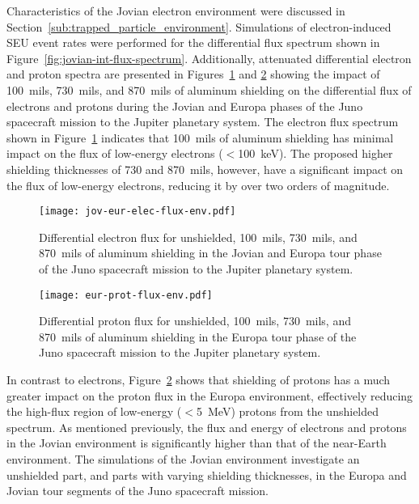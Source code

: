 Characteristics of the Jovian electron environment were discussed in Section~\ref{sub:trapped_particle_environment}.
Simulations of electron-induced SEU event rates were performed for the differential flux spectrum shown in Figure~\ref{fig:jovian-int-flux-spectrum}.
Additionally, attenuated differential electron and proton spectra are presented in Figures~\ref{fig:jov-eur-elec-flux-env} and \ref{fig:eur-prot-flux-env} showing the impact of 100~mils, 730~mils, and 870~mils of aluminum shielding on the differential flux of electrons and protons during the Jovian and Europa phases of the Juno spacecraft mission to the Jupiter planetary system.
The electron flux spectrum shown in Figure~\ref{fig:jov-eur-elec-flux-env} indicates that 100~mils of aluminum shielding has minimal impact on the flux of low-energy electrons ($<$100~keV).
The proposed higher shielding thicknesses of 730 and 870~mils, however, have a significant impact on the flux of low-energy electrons, reducing it by over two orders of magnitude.

\begin{figure}[htbp]
    \begin{center}
        \texttt{[image: jov-eur-elec-flux-env.pdf]}
    \end{center}
    \caption{Differential electron flux for unshielded, 100~mils, 730~mils, and 870~mils of aluminum shielding in the Jovian and Europa tour phase of the Juno spacecraft mission to the Jupiter planetary system.}
    \label{fig:jov-eur-elec-flux-env}
\end{figure}

\begin{figure}[htbp]
    \begin{center}
        \texttt{[image: eur-prot-flux-env.pdf]}
    \end{center}
    \caption{Differential proton flux for unshielded, 100~mils, 730~mils, and 870~mils of aluminum shielding in the Europa tour phase of the Juno spacecraft mission to the Jupiter planetary system.}
    \label{fig:eur-prot-flux-env}
\end{figure}

In contrast to electrons, Figure~\ref{fig:eur-prot-flux-env} shows that shielding of protons has a much greater impact on the proton flux in the Europa environment, effectively reducing the high-flux region of low-energy ($<$5~MeV) protons from the unshielded spectrum.
As mentioned previously, the flux and energy of electrons and protons in the Jovian environment is significantly higher than that of the near-Earth environment.
The simulations of the Jovian environment investigate an unshielded part, and parts with varying shielding thicknesses, in the Europa and Jovian tour segments of the Juno spacecraft mission.


